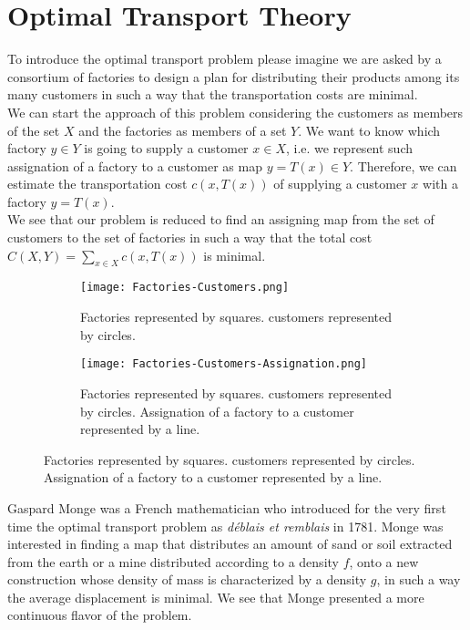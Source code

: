 \chapter{Optimal Transport Theory}
\label{chr: Optimal Transport Theory.}
To introduce the optimal transport problem please imagine we are asked by a consortium of factories to design a plan for distributing their products among its many customers in such a way that the transportation costs are minimal. \\


We can start the approach of this problem considering the customers as members of the set $X$ and the factories as members of a set $Y$. We want to know which factory $y\in Y$ is going to supply a customer $x\in X$, i.e. we represent such assignation of a factory to a customer as map $y=T(x)\in Y$. Therefore, we can estimate the transportation cost $c(x, T(x))$ of supplying a customer $x$ with a factory $y=T(x)$.  \\

We see that our problem is reduced to find an assigning map from the set of customers to the set of factories in such a way that the total cost $C(X, Y)=\sum_{x\in X} c(x, T(x))$ is minimal.  
\\
\begin{figure}[H]
	\centering
	\caption{Illustration of the problem of Factories supplying customers.}
	\begin{subfigure}[t]{0.4\textwidth}
		\texttt{[image: Factories-Customers.png]}
		\caption{Factories represented by squares. customers represented by circles.}
	\end{subfigure}
	\hfil
	\begin{subfigure}[t]{0.4\textwidth}
		\texttt{[image: Factories-Customers-Assignation.png]}
		\caption{Factories represented by squares. customers represented by circles. Assignation of a factory to a customer represented by a line.}
	\end{subfigure}	
\end{figure}

Gaspard Monge was a French mathematician who introduced for the very first time the optimal transport problem as \textit{d\'eblais et remblais} in 1781. Monge was interested in finding a map that distributes an amount of sand or soil extracted from the earth or a mine distributed according to a density $f$, onto a new construction whose density of mass is characterized by a density $g$, in such a way the average displacement is minimal. We see that Monge presented a more continuous flavor of the problem. \\


